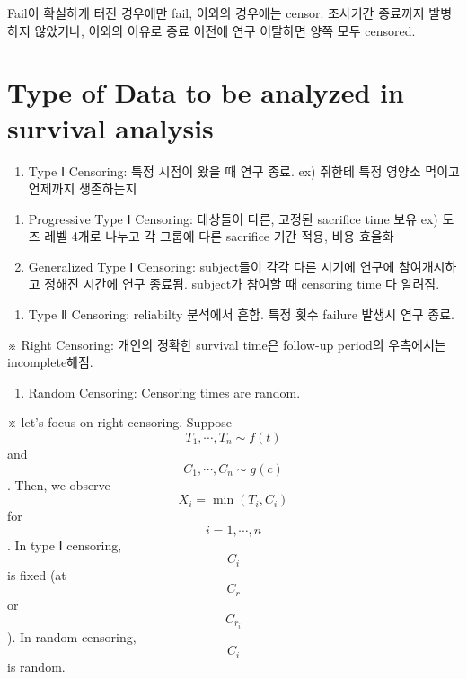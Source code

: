 \documentclass[
]{book}
\providecommand{\tightlist}{%
  \setlength{\itemsep}{0pt}\setlength{\parskip}{0pt}}
\theoremstyle{definition}
\theoremstyle{definition}
\theoremstyle{definition}
\theoremstyle{definition}
\theoremstyle{remark}
\begin{document}
Fail이 확실하게 터진 경우에만 fail, 이외의 경우에는 censor. 조사기간 종료까지 발병하지 않았거나, 이외의 이유로 종료 이전에 연구 이탈하면 양쪽 모두 censored.

\hypertarget{type-of-data-to-be-analyzed-in-survival-analysis}{%
\section{Type of Data to be analyzed in survival analysis}\label{type-of-data-to-be-analyzed-in-survival-analysis}}

\begin{enumerate}
\def\labelenumi{\arabic{enumi}.}
\tightlist
\item
  Type Ⅰ Censoring:
  특정 시점이 왔을 때 연구 종료. ex) 쥐한테 특정 영양소 먹이고 언제까지 생존하는지
\end{enumerate}

\begin{enumerate}
\def\labelenumi{\arabic{enumi})}
\tightlist
\item
  Progressive Type Ⅰ Censoring: 대상들이 다른, 고정된 sacrifice time 보유 ex) 도즈 레벨 4개로 나누고 각 그룹에 다른 sacrifice 기간 적용, 비용 효율화
\item
  Generalized Type Ⅰ Censoring: subject들이 각각 다른 시기에 연구에 참여개시하고 정해진 시간에 연구 종료됨. subject가 참여할 때 censoring time 다 알려짐.
\end{enumerate}

\begin{enumerate}
\def\labelenumi{\arabic{enumi}.}
\setcounter{enumi}{1}
\tightlist
\item
  Type Ⅱ Censoring:
  reliabilty 분석에서 흔함. 특정 횟수 failure 발생시 연구 종료.
\end{enumerate}

※ Right Censoring: 개인의 정확한 survival time은 follow-up period의 우측에서는 incomplete해짐.

\begin{enumerate}
\def\labelenumi{\arabic{enumi}.}
\setcounter{enumi}{2}
\tightlist
\item
  Random Censoring:
  Censoring times are random.
\end{enumerate}

※ let's focus on right censoring. Suppose \[T_1 , \cdots, T_n \sim f(t)\] and \[C_1 , \cdots, C_n \sim g(c)\]. Then, we observe \[X_i = \min(T_i , C_i )\] for \[i = 1, \cdots, n\]. In type Ⅰ censoring, \[C_i\] is fixed (at \[C_r\] or \[C_{r_i}\]). In random censoring, \[C_i\] is random.
\end{document}
